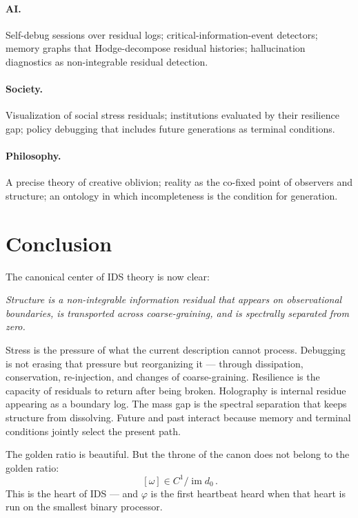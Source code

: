 \documentclass[11pt,a4paper]{article}
\newenvironment{canonbox}{\begin{mdframed}[style=canon]\itshape}{\end{mdframed}}
\theoremstyle{plain}
\begin{document}
\paragraph{AI.} Self-debug sessions over residual logs; critical-information-event detectors; memory graphs that Hodge-decompose residual histories; hallucination diagnostics as non-integrable residual detection.

\paragraph{Society.} Visualization of social stress residuals; institutions evaluated by their resilience gap; policy debugging that includes future generations as terminal conditions.

\paragraph{Philosophy.} A precise theory of creative oblivion; reality as the co-fixed point of observers and structure; an ontology in which incompleteness is the condition for generation.

\section{Conclusion}\label{sec:conclusion}

The canonical center of IDS theory is now clear:

\begin{canonbox}
Structure is a non-integrable information residual that appears on observational boundaries, is transported across coarse-graining, and is spectrally separated from zero.
\end{canonbox}

Stress is the pressure of what the current description cannot process. Debugging is not erasing that pressure but reorganizing it --- through dissipation, conservation, re-injection, and changes of coarse-graining. Resilience is the capacity of residuals to return after being broken. Holography is internal residue appearing as a boundary log. The mass gap is the spectral separation that keeps structure from dissolving. Future and past interact because memory and terminal conditions jointly select the present path.

The golden ratio is beautiful. But the throne of the canon does not belong to the golden ratio:
\begin{equation*}
\boxed{\,[\omega]\in C^1/\operatorname{im}d_0\,.}
\end{equation*}
This is the heart of IDS --- and $\varphi$ is the first heartbeat heard when that heart is run on the smallest binary processor.
\end{document}
